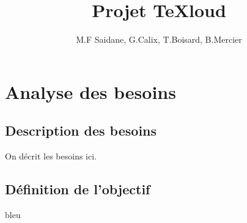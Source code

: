 \documentclass[11pt,a4paper]{article}
\author{M.F Saidane, G.Calix, T.Boisard, B.Mercier}
\title{Projet TeXloud}
\begin{document}
\maketitle
\newpage

\tableofcontents
\newpage

\section{Analyse des besoins}
\subsection{Description des besoins}
On décrit les besoins ici.
\subsection{Définition de l'objectif}

bleu
\end{document}
